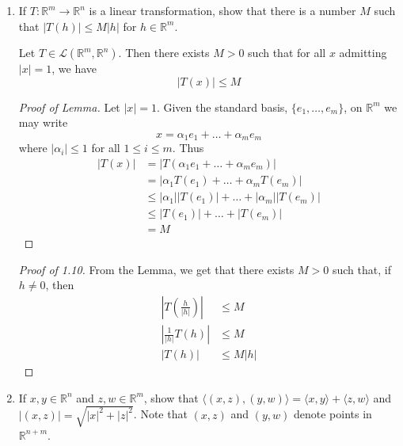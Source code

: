 \begin{enumerate}
    \item[1.10\(^*\)] If \( T: \mathbb{R}^m \rightarrow \mathbb{R}^n \) is a linear transformation, show that there is a number \( M \) such that \( \left| T(h) \right| \leq M \left| h \right| \) for \( h \in \mathbb{R}^m \). 
    
    \begin{lemma}
    Let \( T \in \mathcal{L}(\mathbb{R}^m, \mathbb{R}^n) \). Then there exists \( M>0 \) such that for all \( x \) admitting \( \left| x \right| = 1 \), we have
    \[
    \left| T(x) \right| \leq M
    \]
    \end{lemma}
    
    \begin{proof}[Proof of Lemma]
    Let \( \left| x \right| = 1 \). Given the standard basis, \( \{e_1, \ldots, e_m \} \), on \( \mathbb{R}^m \) we may write
    \[
    x = \alpha_1 e_1 + \ldots + \alpha_m e_m
    \]
    where \( \left| \alpha_i \right| \leq 1 \) for all \( 1 \leq i \leq m \). Thus
    \begin{align*}
        \left| T(x) \right| &= \left| T(\alpha_1 e_1 + \ldots + \alpha_m e_m) \right| \\
        &= \left| \alpha_1T(e_1) + \ldots + \alpha_m T(e_m) \right| \\
        &\leq \left| \alpha_1 \right| \left| T(e_1) \right| + \ldots + \left| \alpha_m \right| \left| T(e_m) \right| \\
        &\leq \left| T(e_1) \right|+\ldots+\left| T(e_m) \right| \\
        &= M
    \end{align*}
    \end{proof}
    
    \begin{proof}[Proof of 1.10]
    From the Lemma, we get that there exists \( M > 0 \) such that, if \( h \neq 0 \), then
    \begin{align*}
        \left| T\left( \frac{h}{\left| h \right|} \right) \right| & \leq M \\
        \left| \frac{1}{\left| h \right|} T(h) \right| &\leq M \\
        \left| T(h) \right| &\leq M \left| h \right|
    \end{align*}
    \end{proof}
    
    \item[1.11] If \( x,y \in \mathbb{R}^n \) and \( z,w \in \mathbb{R}^m \), show that \( \langle (x,z), (y,w) \rangle = \langle x,y \rangle + \langle z,w \rangle \) and \( \left| (x,z) \right| = \sqrt{\left| x \right|^2 + \left| z \right|^2} \). Note that \( (x,z) \) and \( (y,w) \) denote points in \( \mathbb{R}^{n+m} \). 
    

\end{enumerate}
